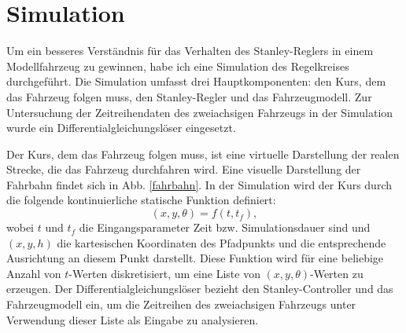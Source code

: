 \documentclass[arbeit=studie,oneside,BCOR=12mm]{ArbeitRST}
\begin{document}

\section{Simulation}


Um ein besseres Verständnis für das Verhalten des Stanley-Reglers in einem
Modellfahrzeug zu gewinnen, habe ich eine Simulation des
Regelkreises durchgeführt. Die Simulation umfasst drei Hauptkomponenten: den
Kurs, dem das Fahrzeug folgen muss, den Stanley-Regler und das Fahrzeugmodell.
Zur Untersuchung der Zeitreihendaten des zweiachsigen Fahrzeugs in der
Simulation wurde ein Differentialgleichungslöser eingesetzt.

Der Kurs, dem das Fahrzeug folgen muss, ist eine virtuelle Darstellung der
realen Strecke, die das Fahrzeug durchfahren wird. Eine visuelle
Darstellung der Fahrbahn findet sich in Abb. \ref{fahrbahn}. In der Simulation wird der
Kurs durch die folgende kontinuierliche statische Funktion definiert:
\begin{equation} 
  (x, y, \theta) = f(t, t_f), 
\end{equation} 
wobei $t$ und $t_f$ die Eingangsparameter Zeit bzw. Simulationsdauer sind
und $(x, y, h)$ die kartesischen Koordinaten des Pfadpunkts und die
entsprechende Ausrichtung an diesem Punkt darstellt. Diese Funktion wird für
eine beliebige Anzahl von $t$-Werten diskretisiert, um eine Liste von $(x, y,
\theta)$-Werten zu erzeugen. Der Differentialgleichungslöser bezieht den
Stanley-Controller und das Fahrzeugmodell ein, um die Zeitreihen des
zweiachsigen Fahrzeugs unter Verwendung dieser Liste als Eingabe zu
analysieren.
\end{document}

